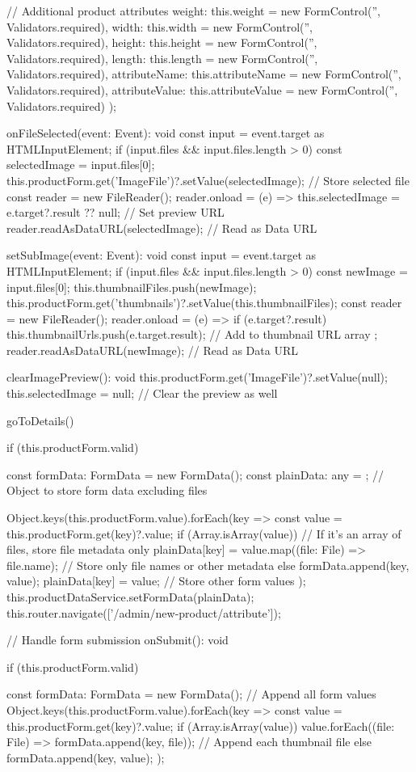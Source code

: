 {{{       // Additional product attributes
      weight: this.weight = new FormControl('', Validators.required),
      width: this.width = new FormControl('', Validators.required),
      height: this.height = new FormControl('', Validators.required),
      length: this.length = new FormControl('', Validators.required),
      attributeName: this.attributeName = new FormControl('', Validators.required),
      attributeValue: this.attributeValue = new FormControl('', Validators.required)
    });
  }

  onFileSelected(event: Event): void {
    const input = event.target as HTMLInputElement;
    if (input.files && input.files.length > 0) {
      const selectedImage = input.files[0];
      this.productForm.get('ImageFile')?.setValue(selectedImage); // Store selected file
      const reader = new FileReader();
      reader.onload = (e) => this.selectedImage = e.target?.result ?? null; // Set preview URL
      reader.readAsDataURL(selectedImage); // Read as Data URL
    }
  }

  setSubImage(event: Event): void {
    const input = event.target as HTMLInputElement;
    if (input.files && input.files.length > 0) {
      const newImage = input.files[0];
      this.thumbnailFiles.push(newImage);
      this.productForm.get('thumbnails')?.setValue(this.thumbnailFiles);
      const reader = new FileReader();
      reader.onload = (e) => {
        if (e.target?.result) {
          this.thumbnailUrls.push(e.target.result); // Add to thumbnail URL array
        }
      };
      reader.readAsDataURL(newImage); // Read as Data URL
    }
  }

  clearImagePreview(): void {
    this.productForm.get('ImageFile')?.setValue(null);
    this.selectedImage = null; // Clear the preview as well
  }


  goToDetails() {
    if (this.productForm.valid) {
      const formData: FormData = new FormData();
      const plainData: any = {}; // Object to store form data excluding files

      Object.keys(this.productForm.value).forEach(key => {
        const value = this.productForm.get(key)?.value;
        if (Array.isArray(value)) {
          // If it's an array of files, store file metadata only
          plainData[key] = value.map((file: File) => file.name); // Store only file names or other metadata
        } else {
          formData.append(key, value);
          plainData[key] = value; // Store other form values
        }
      });
      this.productDataService.setFormData(plainData);
      this.router.navigate(['/admin/new-product/attribute']);
    }
  }
  // Handle form submission
  onSubmit(): void {
    if (this.productForm.valid) {
      const formData: FormData = new FormData();
      // Append all form values
      Object.keys(this.productForm.value).forEach(key => {
        const value = this.productForm.get(key)?.value;
        if (Array.isArray(value)) {
          value.forEach((file: File) => formData.append(key, file)); // Append each thumbnail file
        } else {
          formData.append(key, value);
        }
      });

}}}

